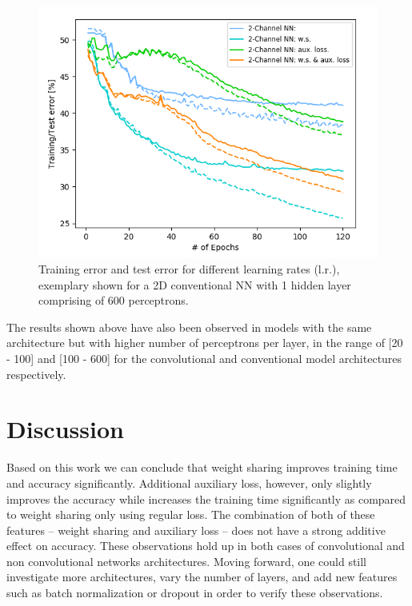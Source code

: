 \documentclass[a4paper, 12pt, conference]{article}
\begin{document}
\begin{figure}[H]
	\centering
  \includegraphics[scale=0.5]{ImpactOfFeatures2DNN.png}
  \caption{Training error and test error for different learning rates (l.r.), exemplary shown for a 2D conventional NN with 1 hidden layer comprising of 600 perceptrons.}
  \label{fig::ImpactOfFeatures2DNN}
\end{figure}
The results shown above have also been observed in models with the same architecture but with higher number of perceptrons per layer, in the range of [20 - 100] and [100 - 600] for the convolutional and conventional model architectures respectively. 

\section{Discussion}
Based on this work we can conclude that weight sharing improves training time and accuracy significantly.
Additional auxiliary loss, however, only slightly improves the accuracy while increases the training time significantly as compared to weight sharing only using regular loss. The combination of both of these features -- weight sharing and auxiliary loss -- does not have a strong additive effect on accuracy. These observations hold up in both cases of convolutional and non convolutional networks architectures. 
Moving forward, one could still investigate more architectures, vary the number of layers, and add new features such as batch normalization or dropout in order to verify these observations.

\end{document}
